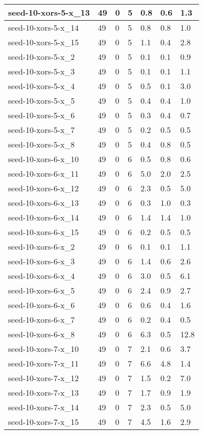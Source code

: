 \begin{scriptsize}
\begin{longtable}{|p{5cm}|l|l|l|l|l|l|}
seed-10-xors-5-x\_13&49&0&5&0.8&0.6&1.3 \\ \hline 
seed-10-xors-5-x\_14&49&0&5&0.8&0.8&1.0 \\ \hline 
seed-10-xors-5-x\_15&49&0&5&1.1&0.4&2.8 \\ \hline 
seed-10-xors-5-x\_2&49&0&5&0.1&0.1&0.9 \\ \hline 
seed-10-xors-5-x\_3&49&0&5&0.1&0.1&1.1 \\ \hline 
seed-10-xors-5-x\_4&49&0&5&0.5&0.1&3.0 \\ \hline 
seed-10-xors-5-x\_5&49&0&5&0.4&0.4&1.0 \\ \hline 
seed-10-xors-5-x\_6&49&0&5&0.3&0.4&0.7 \\ \hline 
seed-10-xors-5-x\_7&49&0&5&0.2&0.5&0.5 \\ \hline 
seed-10-xors-5-x\_8&49&0&5&0.4&0.8&0.5 \\ \hline 
seed-10-xors-6-x\_10&49&0&6&0.5&0.8&0.6 \\ \hline 
seed-10-xors-6-x\_11&49&0&6&5.0&2.0&2.5 \\ \hline 
seed-10-xors-6-x\_12&49&0&6&2.3&0.5&5.0 \\ \hline 
seed-10-xors-6-x\_13&49&0&6&0.3&1.0&0.3 \\ \hline 
seed-10-xors-6-x\_14&49&0&6&1.4&1.4&1.0 \\ \hline 
seed-10-xors-6-x\_15&49&0&6&0.2&0.5&0.5 \\ \hline 
seed-10-xors-6-x\_2&49&0&6&0.1&0.1&1.1 \\ \hline 
seed-10-xors-6-x\_3&49&0&6&1.4&0.6&2.6 \\ \hline 
seed-10-xors-6-x\_4&49&0&6&3.0&0.5&6.1 \\ \hline 
seed-10-xors-6-x\_5&49&0&6&2.4&0.9&2.7 \\ \hline 
seed-10-xors-6-x\_6&49&0&6&0.6&0.4&1.6 \\ \hline 
seed-10-xors-6-x\_7&49&0&6&0.2&0.4&0.5 \\ \hline 
seed-10-xors-6-x\_8&49&0&6&6.3&0.5&12.8 \\ \hline 
seed-10-xors-7-x\_10&49&0&7&2.1&0.6&3.7 \\ \hline 
seed-10-xors-7-x\_11&49&0&7&6.6&4.8&1.4 \\ \hline 
seed-10-xors-7-x\_12&49&0&7&1.5&0.2&7.0 \\ \hline 
seed-10-xors-7-x\_13&49&0&7&1.7&0.9&1.9 \\ \hline 
seed-10-xors-7-x\_14&49&0&7&2.3&0.5&5.0 \\ \hline 
seed-10-xors-7-x\_15&49&0&7&4.5&1.6&2.9 \\ \hline 

\end{longtable}
\end{scriptsize}
